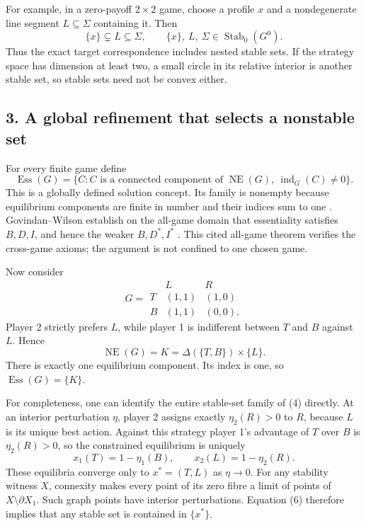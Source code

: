 \documentclass[11pt]{article}
\newcommand{\NE}{\operatorname{NE}}
\newcommand{\Stab}{\operatorname{Stab}_0}
\newcommand{\Ess}{\operatorname{Ess}}
\begin{document}
For example, in a zero-payoff $2\times2$ game, choose a profile $x$ and a nondegenerate line segment $L\subseteq\Sigma$ containing it. Then
\[
 \{x\}\subsetneq L\subseteq\Sigma,
 \qquad \{x\},\ L,\ \Sigma\in\Stab(G^0).                    \tag{2}
\]
Thus the exact target correspondence includes nested stable sets. If the strategy space has dimension at least two, a small circle in its relative interior is another stable set, so stable sets need not be convex either.

\subsection*{3. A global refinement that selects a nonstable set}
For every finite game define
\[
 \Ess(G)=\{C:C\text{ is a connected component of }\NE(G),
                      \ \operatorname{ind}_G(C)\ne0\}.
                                                               \tag{3}
\]
This is a globally defined solution concept. Its family is nonempty because equilibrium components are finite in number and their indices sum to one \cite[Section 2.1]{glp}. Govindan--Wilson establish on the all-game domain that essentiality satisfies $B,D,I$, and hence the weaker $B,D^*,I^*$ \cite[Theorem 6.5]{gw}. This cited all-game theorem verifies the cross-game axioms; the argument is not confined to one chosen game.

Now consider
\[
G=\begin{array}{c|cc}
 &L&R\\\hline
T&(1,1)&(1,0)\\
B&(1,1)&(0,0).
\end{array}                                                     \tag{4}
\]
Player 2 strictly prefers $L$, while player 1 is indifferent between $T$ and $B$ against $L$. Hence
\[
 \NE(G)=K=\Delta(\{T,B\})\times\{L\}.                         \tag{5}
\]
There is exactly one equilibrium component. Its index is one, so $\Ess(G)=\{K\}$.

For completeness, one can identify the entire stable-set family of (4) directly. At an interior perturbation $\eta$, player 2 assigns exactly $\eta_2(R)>0$ to $R$, because $L$ is its unique best action. Against this strategy player 1's advantage of $T$ over $B$ is $\eta_2(R)>0$, so the constrained equilibrium is uniquely
\[
 x_1(T)=1-\eta_1(B),\qquad x_2(L)=1-\eta_2(R).                \tag{6}
\]
These equilibria converge only to $x^*=(T,L)$ as $\eta\to0$. For any stability witness $X$, connexity makes every point of its zero fibre a limit of points of $X\setminus\partial X_1$. Such graph points have interior perturbations. Equation (6) therefore implies that any stable set is contained in $\{x^*\}$.
\end{document}
